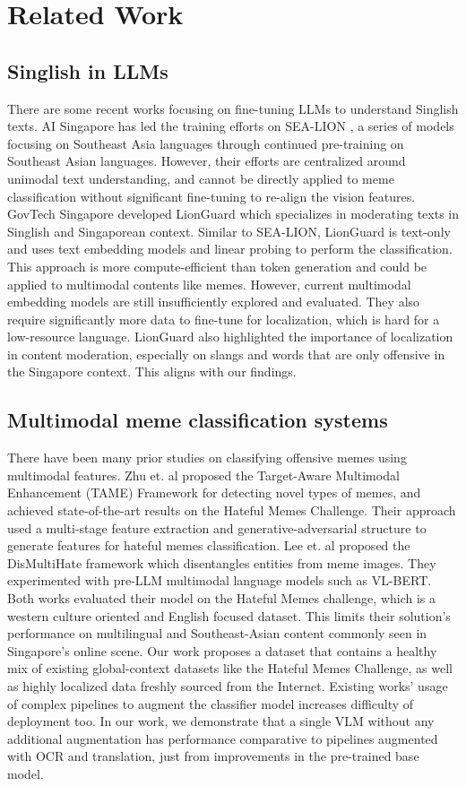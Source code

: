 \section{Related Work}
\subsection{Singlish in LLMs}
There are some recent works focusing on fine-tuning LLMs to understand Singlish texts. AI Singapore has led the training efforts on SEA-LION \cite{sea_lion_2024}, a series of models focusing on Southeast Asia languages through continued pre-training on Southeast Asian languages. However, their efforts are centralized around unimodal text understanding, and cannot be directly applied to meme classification without significant fine-tuning to re-align the vision features. GovTech Singapore developed LionGuard \cite{lionguard} which specializes in moderating texts in Singlish and Singaporean context. Similar to SEA-LION, LionGuard is text-only and uses text embedding models and linear probing to perform the classification. This approach is more compute-efficient than token generation and could be applied to multimodal contents like memes. However, current multimodal embedding models are still insufficiently explored and evaluated. They also require significantly more data to fine-tune for localization, which is hard for a low-resource language. LionGuard also highlighted the importance of localization in content moderation, especially on slangs and words that are only offensive in the Singapore context. This aligns with our findings.

\subsection{Multimodal meme classification systems}
There have been many prior studies on classifying offensive memes using multimodal features. Zhu et. al\cite{multimodal_zeroshot_hateful_memes_detection} proposed the Target-Aware Multimodal Enhancement (TAME) Framework for detecting novel types of memes, and achieved state-of-the-art results on the Hateful Memes Challenge. Their approach used a multi-stage feature extraction and generative-adversarial structure to generate features for hateful memes classification. Lee et. al\cite{disentangling_hate_in_online_memes} proposed the DisMultiHate framework which disentangles entities from meme images. They experimented with pre-LLM multimodal language models such as VL-BERT. Both works evaluated their model on the Hateful Memes challenge, which is a western culture oriented and English focused dataset. This limits their solution's performance on multilingual and Southeast-Asian content commonly seen in Singapore's online scene. Our work proposes a dataset that contains a healthy mix of existing global-context datasets like the Hateful Memes Challenge, as well as highly localized data freshly sourced from the Internet. Existing works' usage of complex pipelines to augment the classifier model increases difficulty of deployment too. In our work, we demonstrate that a single VLM without any additional augmentation has performance comparative to pipelines augmented with OCR and translation, just from improvements in the pre-trained base model.

